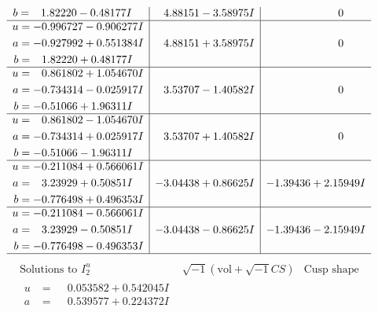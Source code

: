 \documentclass[1p]{elsarticle_modified}
\theoremstyle{definition}
\newcommand{\I}{\sqrt{-1}}
\begin{document}
$$\begin{array}{c|c|c}
\begin{aligned}
b &= \phantom{-}1.82220 - 0.48177 I\end{aligned}
 & \phantom{-}4.88151 - 3.58975 I & \phantom{-0.000000 } 0 \\ \hline\begin{aligned}
u &= -0.996727 - 0.906277 I \\
a &= -0.927992 + 0.551384 I \\
b &= \phantom{-}1.82220 + 0.48177 I\end{aligned}
 & \phantom{-}4.88151 + 3.58975 I & \phantom{-0.000000 } 0 \\ \hline\begin{aligned}
u &= \phantom{-}0.861802 + 1.054670 I \\
a &= -0.734314 - 0.025917 I \\
b &= -0.51066 + 1.96311 I\end{aligned}
 & \phantom{-}3.53707 - 1.40582 I & \phantom{-0.000000 } 0 \\ \hline\begin{aligned}
u &= \phantom{-}0.861802 - 1.054670 I \\
a &= -0.734314 + 0.025917 I \\
b &= -0.51066 - 1.96311 I\end{aligned}
 & \phantom{-}3.53707 + 1.40582 I & \phantom{-0.000000 } 0 \\ \hline\begin{aligned}
u &= -0.211084 + 0.566061 I \\
a &= \phantom{-}3.23929 + 0.50851 I \\
b &= -0.776498 + 0.496353 I\end{aligned}
 & -3.04438 + 0.86625 I & -1.39436 + 2.15949 I \\ \hline\begin{aligned}
u &= -0.211084 - 0.566061 I \\
a &= \phantom{-}3.23929 - 0.50851 I \\
b &= -0.776498 - 0.496353 I\end{aligned}
 & -3.04438 - 0.86625 I & -1.39436 - 2.15949 I\\
 \hline 
 \end{array}$$\newpage$$\begin{array}{c|c|c}  
\text{Solutions to }I^u_{2}& \I (\text{vol} + \sqrt{-1}CS) & \text{Cusp shape}\\
 \hline 
\begin{aligned}
u &= \phantom{-}0.053582 + 0.542045 I \\
a &= \phantom{-}0.539577 + 0.224372 I \\

\end{aligned}
\end{array}$$
\end{document}
